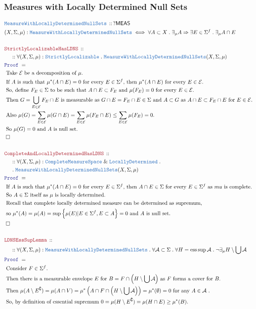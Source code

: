 \documentclass[12pt]{scrartcl}
\newcommand{\TYPE}[1]{\textcolor{NavyBlue}{\mathtt{#1}}}
\newcommand{\LOGIC}[1]{\textcolor{Blue}{\mathtt{#1}}}
\newcommand{\THM}[1]{\textcolor{Maroon}{\mathtt{#1}}}
\renewcommand{\.}{\; . \;}
\newcommand{\Theorem}[2]{& \THM{#1} \, :: \, #2 \\ & \Proof = \\ }
\newcommand{\DeclareType}[2]{& \TYPE{#1} \, :: \, #2 \\}
\newcommand{\DefineType}[3]{& #1 : \TYPE{#2} \iff #3 \\}
\newcommand{\NewLine}{\\ & \kern 1pc}
\newcommand{\Page}[1]{ \begin{align*} #1 \end{align*}   }
\renewcommand{\And}{\; \& \;}
\newcommand{\Imply}{\Rightarrow}
\renewcommand{\c}{\complement}
\newcommand{\QED}{\; \square}
\newcommand{\EndProof}{& \QED \\}
\newcommand{\Proof}{\LOGIC{Proof} \; }
\newcommand{\Explain}[1]{& \text{#1.} \\}
\newcommand{\ExplainFurther}[1]{& \text{#1} \\}
\newcommand{\A}{\mathcal{A}}
\newcommand{\CMS}{\TYPE{CompleteMeasureSpace}}
\newcommand{\SLoc}{\TYPE{StrictlyLocalizable}}
\newcommand{\LocDet}{\TYPE{LocallyDetermined}}
\newcommand{\MwLDNS}{\TYPE{MeasureWithLocallyDeterminedNullSets}}
\DeclareMathOperator{\esssup}{ess\sup}
\newcommand{\E}{\mathcal{E}}
\newcommand{\MEAS}{\mathsf{MEAS}}
\begin{document}
\subsubsection{Measures with Locally Determined Null Sets}
\Page{
	\DeclareType{\MwLDNS}{?\MEAS}
	\DefineType{(X,\Sigma,\mu)}{\MwLDNS}
	{
		\forall  A \subset X  \. 
		\exists_\mu A \Imply \exists E \in \Sigma^f \. 
		\exists_\mu  A \cap E	
	}
	\\
	\Theorem{StrictlyLocalizableHasLDNS}
	{
		\NewLine ::
		\forall (X,\Sigma,\mu) : \SLoc \.
		\MwLDNS(X,\Sigma,\mu)
	}
	\Explain{ 
		Take $\E$ be a decomposition of $\mu$}
	\Explain{
		If $A$ is such that $\mu^*(A \cap E) = 0$ for every $E \in \Sigma^f$, then
		$\mu^*(A \cap E)$ for every $E \in \E$}
	\Explain{
		So, define $F_E \in \Sigma$ to be such that $A \cap E \subset F_E$ and $\mu(F_E)=0$ for every $E \in \E$}
	\Explain{
		Then $G = \bigcup_{E \in \E} F_E \cap E$ is measurable as $G \cap E = F_E \cap E \in \Sigma$ and 
		$A \subset G$ as $A \cap E \subset F_E \cap E$ for $E \in \E$}
	\Explain{ 
		Also $\mu(G) = \sum_{E \in \E} \mu(G \cap E) = \sum_{E \in \E} \mu(F_E \cap E) 
		\le \sum_{E \in \E} \mu(F_E) = 0$}
	\Explain{
		So $\mu(G) = 0$ and $A$ is null set}
	\EndProof
	\\
	\Theorem{CompleteAndLocallyDeterminedHasLDNS}
	{
		\NewLine ::
		\forall (X,\Sigma,\mu) : \CMS \And \LocDet \. \NewLine \.
		\MwLDNS(X,\Sigma,\mu)
	}
	\Explain{
		If $A$ is such that $\mu^*(A \cap E) = 0$ for every $E \in \Sigma^f$, then
		$A \cap E \in \Sigma$ for every $E \in \Sigma^f$ as $mu$ is complete}
	\Explain{
		So $A \in \Sigma$ itself as $\mu$ is locally determined}
	\ExplainFurther{
		Recall that complete locally determined measure can be determined as supremum,}
	\Explain{
		so
		$
			\mu^*(A) = \mu(A) = \sup \Big\{ \mu(E) | E \in \Sigma^f , E \subset A \Big\} = 0
		$ and $A$ is null set}
	\EndProof
	\\
	\Theorem{LDNSEssSupLemma}
	{
		\NewLine ::		
		\forall (X,\Sigma,\mu) : \MwLDNS \.
		\forall \A \subset \Sigma \.
		\forall H = \esssup \A \.
		\neg \exists_\mu H \setminus \bigcup \A 
	}
	\Explain{ 
		Consider $F \in \Sigma^f$}
	\Explain{
		Then there is a measurable envelope $E$ for $B = F \cap \left(H \setminus \bigcup \A\right)$	
		as $F$ forms a cover for $B$}
	\Explain{
		Then $\mu(A \setminus E^\c) = \mu(A \cap V) = 
		\mu^*\left(  A \cap F \cap \left(H \setminus \bigcup \A\right) \right) =\mu^*(\emptyset) =0$
		for any $A \in \A$	
	}
	\Explain{
		So, by definition of essential supremum 
		$ 0 = \mu(H \setminus  E^\c) = \mu(H \cap E) \ge \mu^*(B)$}
}
\end{document}
